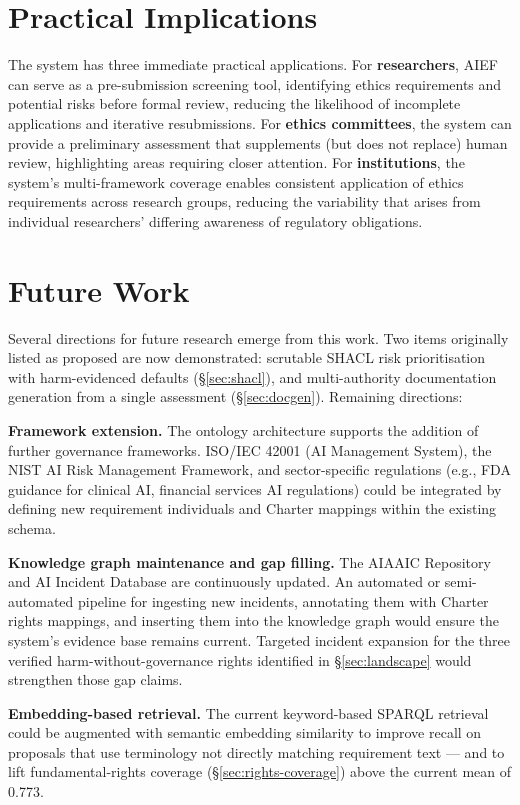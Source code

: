 \section{Practical Implications}

The system has three immediate practical applications. For \textbf{researchers}, AIEF can serve as a pre-submission screening tool, identifying ethics requirements and potential risks before formal review, reducing the likelihood of incomplete applications and iterative resubmissions. For \textbf{ethics committees}, the system can provide a preliminary assessment that supplements (but does not replace) human review, highlighting areas requiring closer attention. For \textbf{institutions}, the system's multi-framework coverage enables consistent application of ethics requirements across research groups, reducing the variability that arises from individual researchers' differing awareness of regulatory obligations.


\section{Future Work}

Several directions for future research emerge from this work. Two items originally listed as proposed are now demonstrated: scrutable SHACL risk prioritisation with harm-evidenced defaults (\S\ref{sec:shacl}), and multi-authority documentation generation from a single assessment (\S\ref{sec:docgen}). Remaining directions:

\textbf{Framework extension.} The ontology architecture supports the addition of further governance frameworks. ISO/IEC 42001 (AI Management System), the NIST AI Risk Management Framework, and sector-specific regulations (e.g., FDA guidance for clinical AI, financial services AI regulations) could be integrated by defining new requirement individuals and Charter mappings within the existing schema.

\textbf{Knowledge graph maintenance and gap filling.} The AIAAIC Repository and AI Incident Database are continuously updated. An automated or semi-automated pipeline for ingesting new incidents, annotating them with Charter rights mappings, and inserting them into the knowledge graph would ensure the system's evidence base remains current. Targeted incident expansion for the three verified harm-without-governance rights identified in \S\ref{sec:landscape} would strengthen those gap claims.

\textbf{Embedding-based retrieval.} The current keyword-based SPARQL retrieval could be augmented with semantic embedding similarity to improve recall on proposals that use terminology not directly matching requirement text --- and to lift fundamental-rights coverage (\S\ref{sec:rights-coverage}) above the current mean of 0.773.

